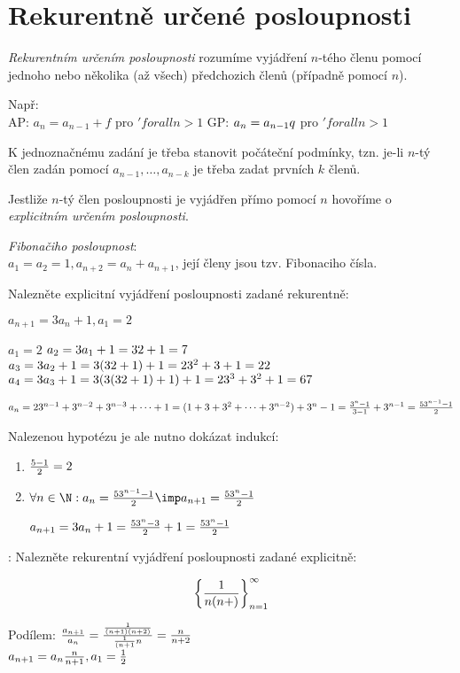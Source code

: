
\BeginDoc{}
\def\posloup{$\zs{a_2}_{n=1}^{\infty}$}
\section{Rekurentně určené posloupnosti}

\Pozenum
\emph{Rekurentním určením posloupnosti} rozumíme vyjádření $n$-tého členu pomocí jednoho nebo několika
(až všech) předchozich členů (případně pomocí $n$).

Např:\\
AP: $a_n=a_{n-1} + f$ pro $'forall n > 1$
GP: $a_n=a_{n-1} \* q$ pro $'forall n > 1$

K jednoznačnému zadání je třeba stanovit počáteční podmínky, tzn. je-li $n$-tý člen
zadán pomocí $a_{n-1},\dots,a_{n-k}$ je třeba zadat prvních $k$ členů.
\item Jestliže $n$-tý člen posloupnosti je vyjádřen přímo pomocí $n$
	hovoříme o  \emph{explicitním určením posloupnosti}.
\End


\Poz \emph{Fibonačiho posloupnost}:\\
$a_1=a_2=1 , a_{n+2}=a_n+a_{n+1}$, její členy jsou tzv. Fibonaciho čísla.

\Pr Nalezněte explicitní vyjádření posloupnosti zadané rekurentně:

$a_{n+1} = 3a_n+1,a_1=2$

$a_1 = 2$
$a_2 = 3a_1+1 = 3\* 2 + 1 = 7$
$a_3 = 3a_2+1 = 3\*(3\* 2 +1) + 1 = 2\*3^2 + 3 +1=22$
$a_4 = 3a_3+1 = 3\*(3\*(3\*2+1) +1) + 1 = 2\*3^3+3^2+1=67$


$a_n = 2\*3^{n-1}+3^{n-2}+3^{n-3}+\cdots+1 = (1+3+3^2+\cdots+3^{n-2})+3^n-1 = \f{3^n-1}{3-1} + 3^{n-1} = \f{53^{n-1}-1}{2}$

Nalezenou hypotézu je ale nutno dokázat indukcí:
\begin{enumerate}
	\item $\frac{5-1}{2}=2$
	\item $\forall n\in\N: a_n=\f{5\*3^{n-1}-1}2 \imp a_{n+1} = \f{5\*3^n-1}2$

		$a_{n+1} = 3a_n+1= \f{5\*3^n-3}2 + 1 = \f{5\*3^n-1}2$
\end{enumerate}



\Pr:
Nalezněte rekurentní vyjádření posloupnosti zadané explicitně:

$$\left\{{\frac1{n(n+)}}\right\}_{n=1}^{\infty}$$

Podílem: $\frac{a_{n+1}}{a_n} = \frac{\frac1{(n+1)(n+2)}}{\frac1{(n+1}n}=\frac{n}{n+2}$\\
$a_{n+1} = a_n \* \f n{n+1},a_1=\f 12$

